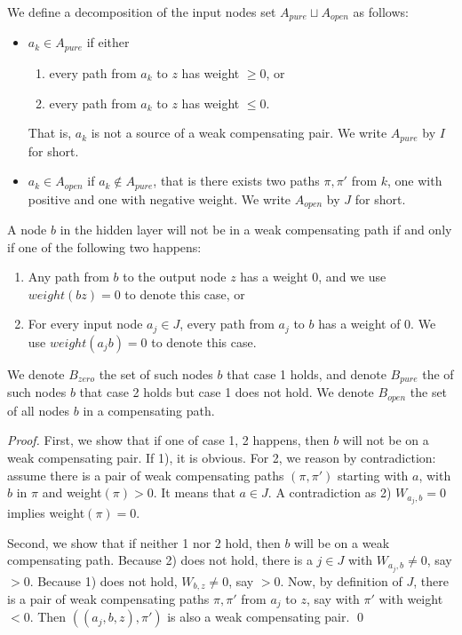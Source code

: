 			
			
			
			\begin{definition}
				We define a decomposition of the input nodes set $A_{pure}\sqcup A_{open}$ as follows:  
				\begin{itemize}
					\item $a_k \in A_{pure}$  if either
					\begin{enumerate}
						\item every path from $a_k$ to $z$ has weight $\geq 0$, or
						\item every path from $a_k$ to $z$ has weight $\leq 0$. 
						
					\end{enumerate}
					That is, $a_k$ is not a source of a weak compensating pair. 	We write $A_{pure}$ by $I$ for short.
					\item $a_k \in A_{open}$ if $a_k \notin A_{pure}$, that is there exists two paths $\pi,\pi'$ from $k$, 
					one with positive and one with negative weight. 	We write $A_{open}$ by $J$ for short.
				\end{itemize}
			\end{definition} 
			
			
			
			\begin{lemma} \label{lem:open_node_2}
				A node $b$ in the hidden layer will not be in a weak compensating path if and only if one of the following two happens:
				\begin{enumerate}
					\item Any path from $b$ to the output node $z$ has a weight $0$, and we use $weight({bz})=0$ to denote this case, or
					\item For every input node $a_j\in J$, every path from $a_j$ to $b$ has a weight of $0$. We use $weight({a_jb})=0$ to denote this case.
				\end{enumerate}
				
			\end{lemma}
			
			We denote $B_{zero}$ the set of such nodes $b$ that case 1 holds, and denote $B_{pure}$ the of such nodes $b$ that case 2 holds but case 1 does not hold.	We denote $B_{open}$ the set of all nodes $b$ in a compensating path.
			
			\begin{proof}
				First, we show that if one of case 1, 2 happens, then $b$ will not be on a weak compensating pair. If 1), it is obvious. For 2, we reason by contradiction: assume there is a pair of weak compensating paths 	$(\pi,\pi')$ starting with $a$, with $b$ in $\pi$ and weight$(\pi) > 0$. It means that $a \in J$. A contradiction as 2) $W_{a_j,b}=0$ implies weight$(\pi)=0$.
				
				Second, we show that if neither 1 nor 2 hold, then $b$ will be on a weak compensating path.
				Because 2) does not hold, there is a $j \in J$ with $W_{a_j,b} \neq 0$, say $>0$.
				Because 1) does not hold, $W_{b,z} \neq 0$, say $>0$.
				Now, by definition of $J$, there is a pair of weak compensating paths $\pi,\pi'$ 
				from $a_j$ to $z$, say with $\pi'$ with weight $<0$.
				Then $((a_j,b,z), \pi')$ is also a weak compensating pair. \qed
			\end{proof}
			
